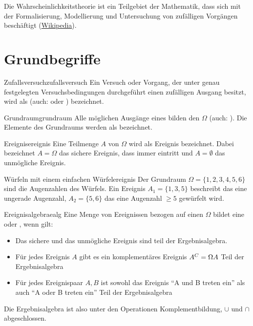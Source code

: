Die Wahrscheinlichkeitstheorie ist ein Teilgebiet der Mathematik, dass sich mit
der Formalisierung, Modellierung und Untersuchung von zufälligen Vorgängen
beschäftigt (\href{https://de.wikipedia.org/wiki/Wahrscheinlichkeitstheorie}
{Wikipedia}).

\section{Grundbegriffe}

\begin{definition}{Zufallsversuch}{zufallsversuch}
Ein Versuch oder Vorgang, der unter genau festgelegten Versuchsbedingungen
durchgeführt einen zufälligen Ausgang besitzt, wird als 
(auch:  oder )
bezeichnet.
\end{definition}

\begin{definition}{Grundraum}{grundraum}
Alle möglichen Ausgänge eines 
bilden den  $\Omega$ (auch: ). Die
Elemente des Grundraums werden als  bezeichnet.
\end{definition}

\begin{definition}{Ereignis}{ereignis}
Eine Teilmenge $A$ von $\Omega$ wird als Ereignis bezeichnet. Dabei bezeichnet
$A = \Omega$ das sichere Ereignis, dass immer eintritt und $A = \emptyset$ das
unmögliche Ereignis.
\end{definition}

\begin{example}{Würfeln mit einem einfachen Würfel}{ereignis}
Der Grundraum $\Omega = \{1,2,3,4,5,6\}$
sind die Augenzahlen des Würfels. Ein Ereignis $A_1 = \{1,3,5\}$ beschreibt das
eine ungerade Augenzahl, $A_2 = \{5,6\}$ das
eine Augenzahl $\ge 5$ gewürfelt wird.
\end{example}

\begin{definition}{Ereignisalgebra}{ealg}
Eine Menge von Ereignissen bezogen auf einen 
$\Omega$ bildet eine  oder , wenn gilt:

  \begin{itemize}
    \item Das sichere und das unmögliche Ereignis sind teil der Ergebnisalgebra.
    \item{Für jedes Ereignis $A$ gibt es ein komplementäres Ereignis $A^C =
\Omega \\ A$ Teil der Ergebnisalgebra}
    \item{Für jedes Ereignispaar $A,B$ ist sowohl das Ereignis "`A und B treten
ein"' als auch "`A oder B treten ein"' Teil der Ergebnisalgebra}
  \end{itemize}

Die Ergebnisalgebra ist also unter den Operationen Komplementbildung, $\cup$ und
$\cap$ abgeschlossen.
\end{definition}

